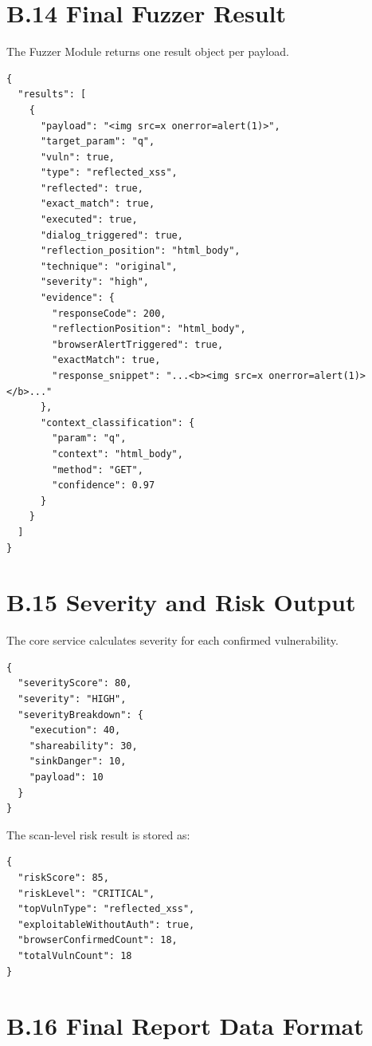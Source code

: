 \section*{B.14 Final Fuzzer Result}

The Fuzzer Module returns one result object per payload.

\begin{lstlisting}[style=appendixcode,caption={Final fuzzer result format}]
{
  "results": [
    {
      "payload": "<img src=x onerror=alert(1)>",
      "target_param": "q",
      "vuln": true,
      "type": "reflected_xss",
      "reflected": true,
      "exact_match": true,
      "executed": true,
      "dialog_triggered": true,
      "reflection_position": "html_body",
      "technique": "original",
      "severity": "high",
      "evidence": {
        "responseCode": 200,
        "reflectionPosition": "html_body",
        "browserAlertTriggered": true,
        "exactMatch": true,
        "response_snippet": "...<b><img src=x onerror=alert(1)></b>..."
      },
      "context_classification": {
        "param": "q",
        "context": "html_body",
        "method": "GET",
        "confidence": 0.97
      }
    }
  ]
}
\end{lstlisting}

\section*{B.15 Severity and Risk Output}

The core service calculates severity for each confirmed vulnerability.

\begin{lstlisting}[style=appendixcode,caption={Severity score format}]
{
  "severityScore": 80,
  "severity": "HIGH",
  "severityBreakdown": {
    "execution": 40,
    "shareability": 30,
    "sinkDanger": 10,
    "payload": 10
  }
}
\end{lstlisting}

The scan-level risk result is stored as:

\begin{lstlisting}[style=appendixcode,caption={Risk analysis format}]
{
  "riskScore": 85,
  "riskLevel": "CRITICAL",
  "topVulnType": "reflected_xss",
  "exploitableWithoutAuth": true,
  "browserConfirmedCount": 18,
  "totalVulnCount": 18
}
\end{lstlisting}

\section*{B.16 Final Report Data Format}

